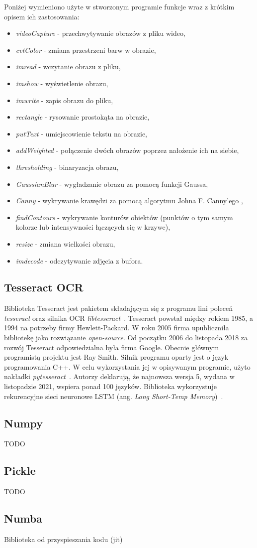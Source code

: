 Poniżej wymieniono użyte w stworzonym programie funkcje wraz z krótkim opisem ich zastosowania:
\begin{itemize}
    \item \textit{videoCapture} - przechwytywanie obrazów z pliku wideo,
    \item \textit{cvtColor} - zmiana przestrzeni barw w obrazie,
    \item \textit{imread} - wczytanie obrazu z pliku,
    \item \textit{imshow} - wyświetlenie obrazu,
    \item \textit{imwrite} - zapis obrazu do pliku,
    \item \textit{rectangle} - rysowanie prostokąta na obrazie,
    \item \textit{putText} - umiejscowienie tekstu na obrazie,
    \item \textit{addWeighted} - połączenie dwóch obrazów poprzez nałożenie ich na siebie,
    \item \textit{thresholding} - binaryzacja obrazu,
    \item \textit{GaussianBlur} - wygładzanie obrazu za pomocą funkcji Gaussa,
    \item \textit{Canny} - wykrywanie krawędzi za pomocą algorytmu Johna F. Canny'ego \cite{4767851},
    \item \textit{findContours} - wykrywanie konturów obiektów (punktów o tym samym kolorze lub intensywności łączących się w krzywe),
    \item \textit{resize} - zmiana wielkości obrazu,
    \item \textit{imdecode} - odczytywanie zdjęcia z bufora.
\end{itemize}

\subsection{Tesseract OCR}
Biblioteka Tesseract jest pakietem składającym się z programu lini poleceń \textit{tesseract} oraz silnika OCR \textit{libtesseract}~\cite{tesseract}.
Tesseract powstał między rokiem 1985, a 1994 na potrzeby firmy Hewlett-Packard.
W roku 2005 firma upubliczniła bibliotekę jako rozwiązanie \textit{open-source}.
Od początku 2006 do listopada 2018 za rozwój Tesseract odpowiedzialna była firma Google.
Obecnie głównym programistą projektu jest Ray Smith.
Silnik programu oparty jest o język programowania C++.
W celu wykorzystania jej w opisywanym programie, użyto nakładki \textit{pytesseract}~\cite{pytesseract}.
Autorzy deklarują, że najnowsza wersja 5, wydana w listopadzie 2021, wspiera ponad 100 języków.
Biblioteka wykorzystuje rekurencyjne sieci neuronowe LSTM (ang. \textit{Long Short-Temp Memory})~\cite{lstm}.

\subsection{Numpy}
TODO

\subsection{Pickle}
TODO

\subsection{Numba}
Biblioteka od przyspieszania kodu (jit)